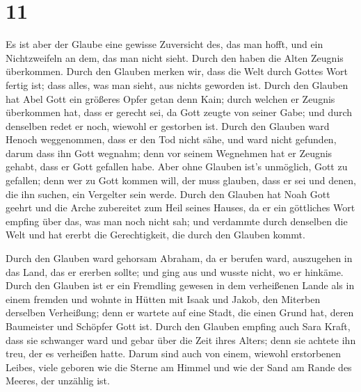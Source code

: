 \hypertarget{section-10}{%
\section{11}\label{section-10}}

 Es ist aber der Glaube eine gewisse Zuversicht des, das
man hofft, und ein Nichtzweifeln an dem, das man nicht sieht.
 Durch den haben die Alten Zeugnis überkommen.
 Durch den Glauben merken wir, dass die Welt durch Gottes
Wort fertig ist; dass alles, was man sieht, aus nichts geworden ist.
 Durch den Glauben hat Abel Gott ein größeres Opfer getan
denn Kain; durch welchen er Zeugnis überkommen hat, dass er gerecht sei,
da Gott zeugte von seiner Gabe; und durch denselben redet er noch,
wiewohl er gestorben ist.  Durch den Glauben ward Henoch
weggenommen, dass er den Tod nicht sähe, und ward nicht gefunden, darum
dass ihn Gott wegnahm; denn vor seinem Wegnehmen hat er Zeugnis gehabt,
dass er Gott gefallen habe.  Aber ohne Glauben ist's
unmöglich, Gott zu gefallen; denn wer zu Gott kommen will, der muss
glauben, dass er sei und denen, die ihn suchen, ein Vergelter sein
werde.  Durch den Glauben hat Noah Gott geehrt und die
Arche zubereitet zum Heil seines Hauses, da er ein göttliches Wort
empfing über das, was man noch nicht sah; und verdammte durch denselben
die Welt und hat ererbt die Gerechtigkeit, die durch den Glauben kommt.

 Durch den Glauben ward gehorsam Abraham, da er berufen
ward, auszugehen in das Land, das er ererben sollte; und ging aus und
wusste nicht, wo er hinkäme.  Durch den Glauben ist er ein
Fremdling gewesen in dem verheißenen Lande als in einem fremden und
wohnte in Hütten mit Isaak und Jakob, den Miterben derselben Verheißung;
 denn er wartete auf eine Stadt, die einen Grund hat,
deren Baumeister und Schöpfer Gott ist.  Durch den
Glauben empfing auch Sara Kraft, dass sie schwanger ward und gebar über
die Zeit ihres Alters; denn sie achtete ihn treu, der es verheißen
hatte.  Darum sind auch von einem, wiewohl erstorbenen
Leibes, viele geboren wie die Sterne am Himmel und wie der Sand am Rande
des Meeres, der unzählig ist.

